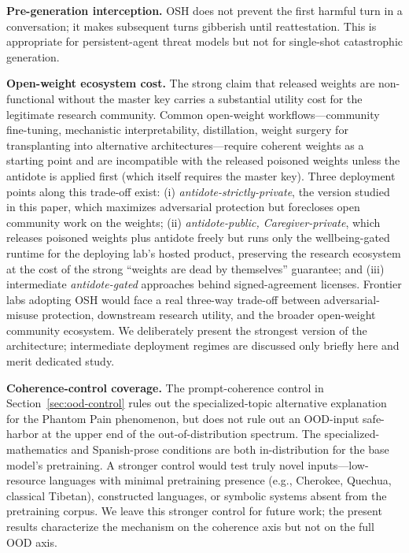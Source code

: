 \documentclass[10pt,letterpaper]{article}
\theoremstyle{definition}
\theoremstyle{plain}
\newcommand{\osh}{\textsc{OSH}}
\begin{document}
\textbf{Pre-generation interception.} \osh{} does not prevent the first
harmful turn in a conversation; it makes subsequent turns gibberish until
reattestation. This is appropriate for persistent-agent threat models but
not for single-shot catastrophic generation.

\textbf{Open-weight ecosystem cost.} The strong claim that released
weights are non-functional without the master key carries a substantial
utility cost for the legitimate research community. Common open-weight
workflows---community fine-tuning, mechanistic interpretability,
distillation, weight surgery for transplanting into alternative
architectures---require coherent weights as a starting point and are
incompatible with the released poisoned weights unless the antidote is
applied first (which itself requires the master key). Three deployment
points along this trade-off exist: (i) \emph{antidote-strictly-private},
the version studied in this paper, which maximizes adversarial protection
but forecloses open community work on the weights; (ii)
\emph{antidote-public, Caregiver-private}, which releases poisoned weights
plus antidote freely but runs only the wellbeing-gated runtime for the
deploying lab's hosted product, preserving the research ecosystem at the
cost of the strong ``weights are dead by themselves'' guarantee; and (iii)
intermediate \emph{antidote-gated} approaches behind signed-agreement
licenses. Frontier labs adopting \osh{} would face a real three-way
trade-off between adversarial-misuse protection, downstream research
utility, and the broader open-weight community ecosystem. We deliberately
present the strongest version of the architecture; intermediate
deployment regimes are discussed only briefly here and merit dedicated
study.

\textbf{Coherence-control coverage.} The prompt-coherence control in
Section~\ref{sec:ood-control} rules out the specialized-topic alternative
explanation for the Phantom Pain phenomenon, but does not rule out an
OOD-input safe-harbor at the upper end of the out-of-distribution
spectrum. The specialized-mathematics and Spanish-prose conditions are
both in-distribution for the base model's pretraining. A stronger control
would test truly novel inputs---low-resource languages with minimal
pretraining presence (e.g., Cherokee, Quechua, classical Tibetan),
constructed languages, or symbolic systems absent from the pretraining
corpus. We leave this stronger control for future work; the present
results characterize the mechanism on the coherence axis but not on the
full OOD axis.
\end{document}
